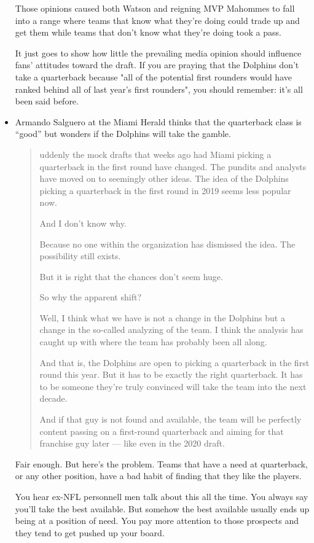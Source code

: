 \begin{itemize}
Those opinions caused both Watson and reigning MVP Mahommes to fall into a range where teams that know what they're doing could trade up and get them while teams that don't know what they're doing took a pass.

It just goes to show how little the prevailing media opinion should influence fans' attitudes toward the draft.  If you are praying that the Dolphins don't take a quarterback because "all of the potential first rounders would have ranked behind all of last year's first rounders", you should remember: it's all been said before.

\item Armando Salguero at the Miami Herald thinks that the quarterback class is ``good'' but wonders if the Dolphins will take the gamble.

  \begin{quote}
    uddenly the mock drafts that weeks ago had Miami picking a quarterback in the first round have changed. The pundits and analysts have moved on to seemingly other ideas. The idea of the Dolphins picking a quarterback in the first round in 2019 seems less popular now.

And I don’t know why.

Because no one within the organization has dismissed the idea. The possibility still exists.

But it is right that the chances don’t seem huge.

So why the apparent shift?

Well, I think what we have is not a change in the Dolphins but a change in the so-called analyzing of the team. I think the analysis has caught up with where the team has probably been all along.

And that is, the Dolphins are open to picking a quarterback in the first round this year. But it has to be exactly the right quarterback. It has to be someone they’re truly convinced will take the team into the next decade.

And if that guy is not found and available, the team will be perfectly content passing on a first-round quarterback and aiming for that franchise guy later — like even in the 2020 draft.
\end{quote}

Fair enough.  But here's the problem.  Teams that have a need at quarterback, or any other position, have a bad habit of finding that they like the players.

You hear ex-NFL personnell men talk about this all the time.  You always say you'll take the best available.  But somehow the best available usually ends up being at a position of need.  You pay more attention to those prospects and they tend to get pushed up your board.


\end{itemize}
